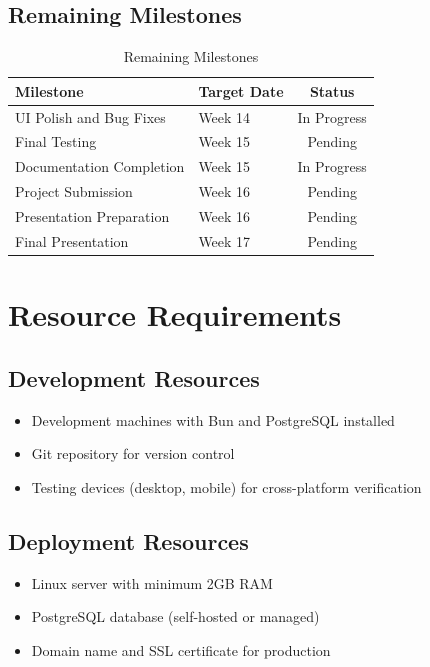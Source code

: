 \subsection{Remaining Milestones}

\begin{table}[htbp]
    \centering
    \caption{Remaining Milestones}
    \label{tab:remaining-milestones}
    \begin{tabular}{llc}
        \toprule
        \textbf{Milestone} & \textbf{Target Date} & \textbf{Status} \\
        \midrule
        UI Polish and Bug Fixes & Week 14 & In Progress \\
        Final Testing & Week 15 & Pending \\
        Documentation Completion & Week 15 & In Progress \\
        Project Submission & Week 16 & Pending \\
        Presentation Preparation & Week 16 & Pending \\
        Final Presentation & Week 17 & Pending \\
        \bottomrule
    \end{tabular}
\end{table}

\section{Resource Requirements}

\subsection{Development Resources}
\begin{itemize}
    \item Development machines with Bun and PostgreSQL installed
    \item Git repository for version control
    \item Testing devices (desktop, mobile) for cross-platform verification
\end{itemize}

\subsection{Deployment Resources}
\begin{itemize}
    \item Linux server with minimum 2GB RAM
    \item PostgreSQL database (self-hosted or managed)
    \item Domain name and SSL certificate for production
\end{itemize}

